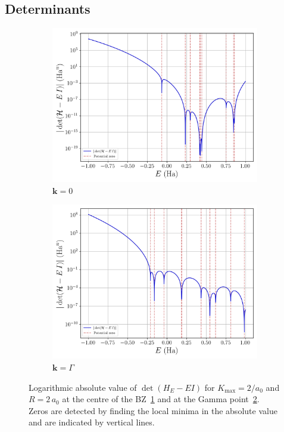 \documentclass[a4paper,DIV=12,english]{scrartcl}
\begin{document}
\FloatBarrier
\subsection{Determinants}
\begin{figure}
    \centering 
    \begin{subfigure}{0.49\textwidth}
        \centering 
        \includegraphics[width=\textwidth]{../plots/det_g_h/det_k_0.0.png}
        \caption{$\textbf{k} = 0$}
        \label{subfig:det0}
    \end{subfigure}
    \begin{subfigure}{0.49\textwidth}
        \centering 
        \includegraphics[width=\textwidth]{../plots/det_g_h/det_k_1.0.png}
        \caption{$\textbf{k} = \Gamma$}
        \label{subfig:detG}
    \end{subfigure}
    \caption{Logarithmic absolute value of $\det(H_E - EI)$ for $K_\text{max} = 2/a_0$ and $R=2\,a_0$ at the centre of the BZ~\ref{subfig:det0} and at the Gamma point~\ref{subfig:detG}. Zeros are detected by finding the local minima in the absolute value and are indicated by vertical lines.}
    \label{fig:det}
\end{figure}
\end{document}
